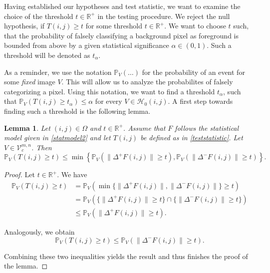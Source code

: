 \documentclass[a4paper,12pt]{article}
\newcommand{\norm}[1]{\lVert#1\rVert}
\theoremstyle{plain}
\newtheorem{lemma}[theorem]{Lemma}
\theoremstyle{definition}
\begin{document}
Having established our hypotheses and test statistic, we want to examine the choice of the threshold $t \in \mathbb{R}^+$ in the testing procedure. We reject the null hypothesis, if $T(i, j) \geq t$ for some threshold $t \in \mathbb{R}^+$. We want to choose $t$ such, that the probability of falsely classifying a background pixel as foreground is bounded from above by a given statistical significance $\alpha \in (0, 1)$. Such a threshold will be denoted as $t_\alpha$.

As a reminder, we use the notation $\mathbb{P}_V( \ldots )$ for the probability of an event for some \emph{fixed} image $V$. This will allow us to analyze the probabilites of falsely categorizing a pixel. Using this notation, we want to find a threshold $t_\alpha$, such that $\mathbb{P}_V( T(i, j) \geq t_\alpha ) \leq \alpha$ for every $V \in \mathcal{H}_0(i, j)$. A first step towards finding such a threshold is the following lemma.

\begin{lemma}\label{lem: typeIbound}
	Let $(i, j) \in \Omega$ and $t \in \mathbb{R}^+$. Assume that $F$ follows the statistical model given in \eqref{statmodel2} and let $T(i, j)$ be defined as in \eqref{teststatistic}. Let $V \in \mathcal{V}_c^{m, n}$. Then
	\begin{equation}
		\mathbb{P}_V( T(i, j) \geq t ) \leq \min \left\{ \mathbb{P}_V( \norm{\Delta^+ F(i, j)} \geq t ), \mathbb{P}_V( \norm{\Delta^- F(i, j)} \geq t ) \right\}.
	\end{equation}
\end{lemma}
\begin{proof}
	Let $t \in \mathbb{R}^+$. We have
	\begin{align*}
		\mathbb{P}_V( T(i, j) \geq t ) &= \mathbb{P}_V( \min \{ \norm{\Delta^+ F(i, j)}, \norm{\Delta^- F(i, j)} \} \geq t ) \\
		&= \mathbb{P}_V( \{ \norm{\Delta^+ F(i, j)} \geq t \} \cap \{ \norm{\Delta^- F(i, j)} \geq t \} ) \\
		&\leq \mathbb{P}_V( \norm{\Delta^+ F(i, j)} \geq t ).
	\end{align*}
	
	Analogously, we obtain
	\begin{equation*}
		\mathbb{P}_V( T(i, j) \geq t ) \leq \mathbb{P}_V( \norm{\Delta^- F(i, j)} \geq t ).
	\end{equation*}
	
	Combining these two inequalities yields the result and thus finishes the proof of the lemma.
\end{proof}
\end{document}

